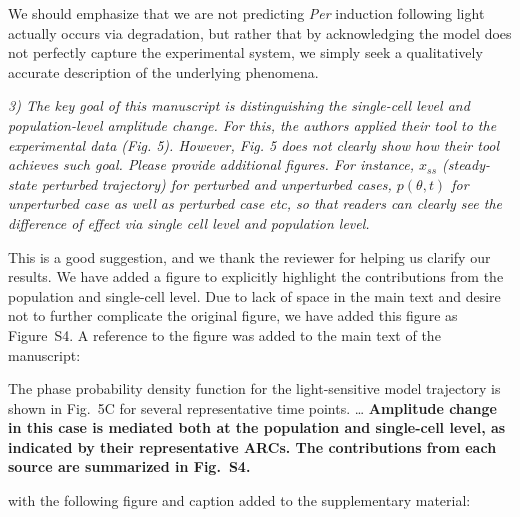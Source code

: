 \documentclass[11pt, letterpaper]{article}
\newenvironment{reviewer}{\itshape\color{gray}}{}
\newenvironment{manuscript}[1]{\begin{center}\begin{tcolorbox}[colback=green!5!white,colframe=green!75!black,width=0.8\textwidth,title={#1},breakable,fonttitle=\bfseries]}{\end{tcolorbox}\end{center}}
\begin{document}
We should emphasize that we are not predicting {\itshape Per} induction following light actually occurs via degradation, but rather that by acknowledging the model does not perfectly capture the experimental system, we simply seek a qualitatively accurate description of the underlying phenomena.

\begin{reviewer}
3) The key goal of this manuscript is distinguishing the single-cell level and population-level amplitude change. For this, the authors applied their tool to the experimental data (Fig. 5). However, Fig. 5 does not clearly show how their tool achieves such goal. Please provide additional figures. For instance, $x_{ss}$ (steady-state perturbed trajectory) for perturbed and unperturbed cases, $p(\theta, t)$ for unperturbed case as well as perturbed case etc, so that readers can clearly see the difference of effect via single cell level and population level.  
\end{reviewer}

This is a good suggestion, and we thank the reviewer for helping us clarify our results.
We have added a figure to explicitly highlight the contributions from the population and single-cell level.
Due to lack of space in the main text and desire not to further complicate the original figure, we have added this figure as Figure~S4.
A reference to the figure was added to the main text of the manuscript:

\begin{manuscript}{Page 16}
The phase probability density function for the light-sensitive model trajectory is shown in Fig.~5C for several representative time points.
\ldots
{\bfseries Amplitude change in this case is mediated both at the population and single-cell level, as indicated by their representative ARCs. The contributions from each source are summarized in Fig.~S4.}
\end{manuscript}

with the following figure and caption added to the supplementary material:
\end{document}
